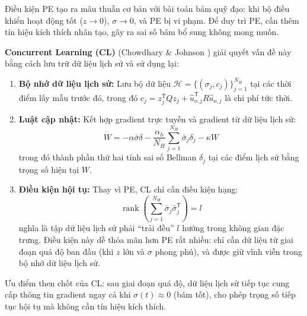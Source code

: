 \documentclass[12pt,a4paper]{article}
\newcommand{\T}{\mathsf{T}}
\DeclareMathOperator{\rank}{rank}
\begin{document}
Điều kiện PE tạo ra mâu thuẫn cơ bản với bài toán bám quỹ đạo: khi bộ điều khiển hoạt động tốt ($z \to 0$), $\sigma \to 0$, và PE bị vi phạm. Để duy trì PE, cần thêm tín hiệu kích thích nhân tạo, gây ra sai số bám bổ sung không mong muốn.

\textbf{Concurrent Learning (CL)} (Chowdhary \& Johnson \cite{Chowdhary2010}) giải quyết vấn đề này bằng cách lưu trữ dữ liệu lịch sử và sử dụng lại:

\begin{enumerate}
    \item \textbf{Bộ nhớ dữ liệu lịch sử:} Lưu bộ dữ liệu $\mathcal{H} = \{(\sigma_j, c_j)\}_{j=1}^{N_H}$ tại các thời điểm lấy mẫu trước đó, trong đó $c_j = z_j^\T Q z_j + \hat{u}_{o,j}^\T R \hat{u}_{o,j}$ là chi phí tức thời.

    \item \textbf{Luật cập nhật:} Kết hợp gradient trực tuyến và gradient từ dữ liệu lịch sử:
    \begin{equation}\label{eq:cl_update}
        \dot{W} = -\alpha\bar{\sigma}\delta - \frac{\alpha_h}{N_H}\sum_{j=1}^{N_H} \bar{\sigma}_j \delta_j - \kappa W
    \end{equation}
    trong đó thành phần thứ hai tính sai số Bellman $\delta_j$ tại các điểm lịch sử bằng trọng số hiện tại $W$.

    \item \textbf{Điều kiện hội tụ:} Thay vì PE, CL chỉ cần điều kiện hạng:
    \begin{equation}\label{eq:rank_condition}
        \rank\left(\sum_{j=1}^{N_H} \bar{\sigma}_j \bar{\sigma}_j^\T\right) = l
    \end{equation}
    nghĩa là tập dữ liệu lịch sử phải ``trải đều'' $l$ hướng trong không gian đặc trưng. Điều kiện này dễ thỏa mãn hơn PE rất nhiều: chỉ cần dữ liệu từ giai đoạn quá độ ban đầu (khi $z$ lớn và $\sigma$ phong phú), và được giữ vĩnh viễn trong bộ nhớ dữ liệu lịch sử.
\end{enumerate}

Ưu điểm then chốt của CL: sau giai đoạn quá độ, dữ liệu lịch sử tiếp tục cung cấp thông tin gradient ngay cả khi $\sigma(t) \approx 0$ (bám tốt), cho phép trọng số tiếp tục hội tụ mà không cần tín hiệu kích thích.
\end{document}
